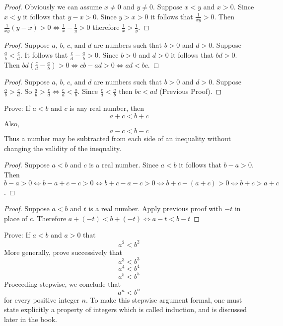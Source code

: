 \documentclass[6pt]{article}
\begin{document}
\begin{proof}
    Obviously we can assume $x \not = 0$ and $y \not = 0$.
    Suppose $x < y$ and $x > 0$.
    Since $x < y$ it follows that $y - x > 0$.
    Since $y > x > 0$ it follows that $\frac{1}{xy} > 0$.
    Then $\frac{1}{xy}(y - x) > 0 \iff \frac{1}{x} - \frac{1}{y} > 0$
        therefore $\frac{1}{x} > \frac{1}{y}$.
\end{proof}

\begin{proof}
    Suppose $a$, $b$, $c$, and $d$ are numbers such that $b > 0$ and $d > 0$.
    Suppose $\frac{a}{b} < \frac{c}{d}$.
    It follows that $\frac{c}{d} - \frac{a}{b} > 0$.
    Since $b > 0$ and $d > 0$ it follows that $bd > 0$.
    Then $bd(\frac{c}{d} - \frac{a}{b}) > 0 \iff cb - ad > 0 \iff ad < bc$.
\end{proof}

\begin{proof}
    Suppose $a$, $b$, $c$, and $d$ are numbers such that $b > 0$ and $d > 0$.
    Suppose $\frac{a}{b} > \frac{c}{d}$.
    So $\frac{a}{b} > \frac{c}{d} \iff \frac{c}{d} < \frac{a}{b}$.
    Since $\frac{c}{d} < \frac{a}{b}$ then $bc < ad$ (Previous Proof).
\end{proof}

\begin{tcolorbox}[title=Problem 5, breakable]
    Prove: If $a < b$ and $c$ is any real number, then 
    \[a + c < b + c\]
    Also,
    \[a - c < b - c\]
    Thus a number may be subtracted from each side of an inequality
    without changing the validity of the inequality.
\end{tcolorbox}

\begin{proof}
    Suppose $a < b$ and $c$ is a 
    real number.
    Since $a < b$ it follows that $b - a > 0$.
    Then $b - a > 0 
            \iff b - a + c -c > 0 
            \iff b + c - a - c > 0 
            \iff b + c - (a + c) > 0 \iff b + c > a + c$.
\end{proof}

\begin{proof}
    Suppose $a < b$ and $t$ is a real number.
    Apply previous proof with $-t$ in place of $c$.
    Therefore $a + (-t) < b + (-t) \iff a - t < b - t$
\end{proof}

\begin{tcolorbox}[title=Problem 6, breakable]
    Prove: If $a < b$ and $a > 0$ that 
    \[a^2 < b^2\]
    More generally, prove successively that
    \[a^3 < b^3\]
    \[a^4 < b^4\]
    \[a^5 < b^5\]
    Proceeding stepwise, we conclude that 
    \[a^n < b^n\]
    for every positive integer $n$. To make this stepwise argument formal,
    one must state explicitly a property of integers which is called induction,
    and is discussed later in the book.
\end{tcolorbox}
\end{document}
